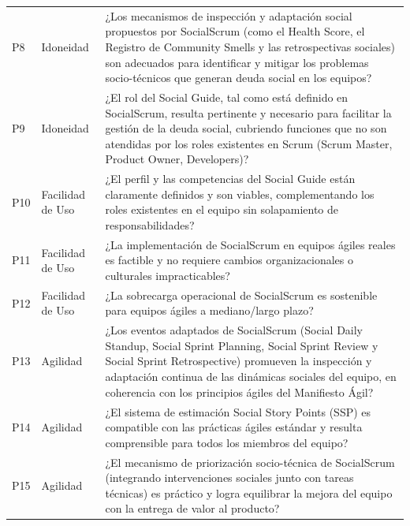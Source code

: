 \begin{longtable}[H]{
    >{\RaggedRight\hspace{0pt}}p{1.2cm} %
    >{\RaggedRight\hspace{0pt}}p{2.8cm} %
    >{\RaggedRight\hspace{0pt}}p{\dimexpr\textwidth-1.2cm-2.8cm-6\tabcolsep\relax} %
    }
    P8           & Idoneidad         & ¿Los mecanismos de inspección y adaptación social propuestos por SocialScrum (como el Health Score, el Registro de Community Smells y las retrospectivas sociales) son adecuados para identificar y mitigar los problemas socio-técnicos que generan deuda social en los equipos?                 \\
    P9           & Idoneidad         & ¿El rol del Social Guide, tal como está definido en SocialScrum, resulta pertinente y necesario para facilitar la gestión de la deuda social, cubriendo funciones que no son atendidas por los roles existentes en Scrum (Scrum Master, Product Owner, Developers)?                               \\
    \midrule
    P10          & Facilidad de Uso  & ¿El perfil y las competencias del Social Guide están claramente definidos y son viables, complementando los roles existentes en el equipo sin solapamiento de responsabilidades?                                                                                                                  \\
    P11          & Facilidad de Uso  & ¿La implementación de SocialScrum en equipos ágiles reales es factible y no requiere cambios organizacionales o culturales impracticables?                                                                                                                                                        \\
    P12          & Facilidad de Uso  & ¿La sobrecarga operacional de SocialScrum es sostenible para equipos ágiles a mediano/largo plazo?                                                                                                                                                                                                \\
    \midrule
    P13          & Agilidad          & ¿Los eventos adaptados de SocialScrum (Social Daily Standup, Social Sprint Planning, Social Sprint Review y Social Sprint Retrospective) promueven la inspección y adaptación continua de las dinámicas sociales del equipo, en coherencia con los principios ágiles del Manifiesto Ágil?         \\
    P14          & Agilidad          & ¿El sistema de estimación Social Story Points (SSP) es compatible con las prácticas ágiles estándar y resulta comprensible para todos los miembros del equipo?                                                                                                                                    \\
    P15          & Agilidad          & ¿El mecanismo de priorización socio-técnica de SocialScrum (integrando intervenciones sociales junto con tareas técnicas) es práctico y logra equilibrar la mejora del equipo con la entrega de valor al producto?                                                                                \\


\end{longtable}
